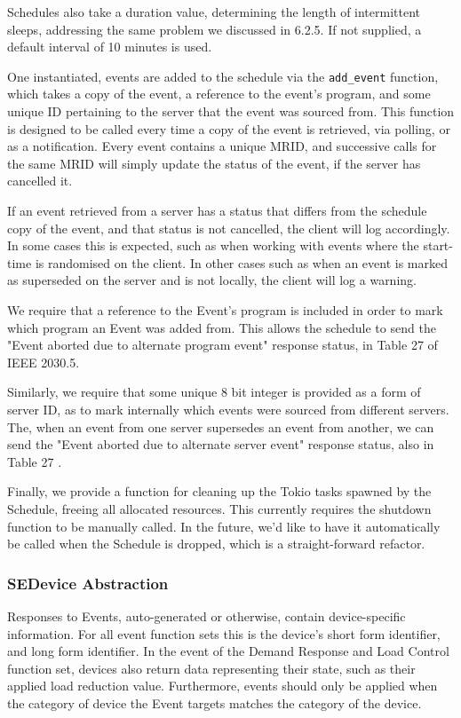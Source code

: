 Schedules also take a duration value, determining the length of intermittent sleeps, addressing the same problem we discussed in 6.2.5. If not supplied, a default interval of 10 minutes is used.

One instantiated, events are added to the schedule via the \texttt{add\_event} function, which takes a copy of the event, a reference to the event's program, and some unique ID pertaining to the server that the event was sourced from. This function is designed to be called every time a copy of the event is retrieved, via polling, or as a notification. Every event contains a unique MRID, and successive calls for the same MRID will simply update the status of the event, if the server has cancelled it. 

If an event retrieved from a server has a status that differs from the schedule copy of the event, and that status is not cancelled, the client will log accordingly. In some cases this is expected, such as when working with events where the start-time is randomised on the client. In other cases such as when an event is marked as superseded on the server and is not locally, the client will log a warning.


We require that a reference to the Event's program is included in order to mark which program an Event was added from. This allows the schedule to send the "Event aborted due to alternate program event" response status, in Table 27 of IEEE 2030.5.

Similarly, we require that some unique 8 bit integer is provided as a form of server ID, as to mark internally which events were sourced from different servers. The, when an event from one server supersedes an event from another, we can send the "Event aborted due to alternate server event" response status, also in Table 27 \cite{IEEE2030.5}. 

Finally, we provide a function for cleaning up the Tokio tasks spawned by the Schedule, freeing all allocated resources. This currently requires the shutdown function to be manually called. In the future, we'd like to have it automatically be called when the Schedule is dropped, which is a straight-forward refactor.

\subsubsection{SEDevice Abstraction}

Responses to Events, auto-generated or otherwise, contain device-specific information. For all event function sets this is the device's short form identifier, and long form identifier. In the event of the Demand Response and Load Control function set, devices also return data representing their state, such as their applied load reduction value.
Furthermore, events should only be applied when the category of device the Event targets matches the category of the device.

